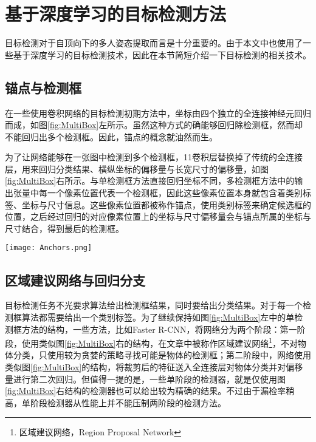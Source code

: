 \section{基于深度学习的目标检测方法}
\label{sec:factsobjectdetection}
目标检测对于自顶向下的多人姿态提取而言是十分重要的。由于本文中也使用了一些基于深度学习的目标检测技术，因此在本节简短介绍一下目标检测的相关技术。

\subsection{锚点与检测框}
\label{subsec:factsanchors}
在一些使用卷积网络的目标检测初期方法中，坐标由四个独立的全连接神经元回归而成，如图\ref{fig:MultiBox}左所示。虽然这种方式的确能够回归除检测框，然而却不能回归出多个检测框。因此，锚点的概念就油然而生。

为了让网络能够在一张图中检测到多个检测框，1\times1卷积层替换掉了传统的全连接层，用来回归分类结果、横纵坐标的偏移量与长宽尺寸的偏移量，如图\ref{fig:MultiBox}右所示。与单检测框方法直接回归坐标不同，多检测框方法中的输出张量中每一个像素位置代表一个检测框，因此这些像素位置本身就包含着类别标签、坐标与尺寸信息。这些像素位置都被称作锚点，使用类别标签来确定候选框的位置，之后经过回归的对应像素位置上的坐标与尺寸偏移量会与锚点所属的坐标与尺寸结合，得到最后的检测框。

\begin{figure*}[htbp]	
	\centering
	\texttt{[image: Anchors.png]}
	\caption{基于卷积神经网络的但检测框与多检测框方法}
	\label{fig:MultiBox}
\end{figure*}

\subsection{区域建议网络与回归分支}
\label{subsec:factsRPNregression}
目标检测任务不光要求算法给出检测框结果，同时要给出分类结果。对于每一个检测框算法都需要给出一个类别标签。为了继续保持如图\ref{fig:MultiBox}左中的单检测框方法的结构，一些方法，比如Faster R-CNN\cite{Ren2015Faster}，将网络分为两个阶段：第一阶段，使用类似图\ref{fig:MultiBox}右的结构，在文章中被称作区域建议网络\footnote{区域建议网络，Region Proposal Network}，不对物体分类，只使用较为贪婪的策略寻找可能是物体的检测框；第二阶段中，网络使用类似图\ref{fig:MultiBox}的结构，将裁剪后的特征送入全连接层对物体分类并对偏移量进行第二次回归。但值得一提的是，一些单阶段的检测器，就是仅使用图\ref{fig:MultiBox}右结构的检测器也可以给出较为精确的结果。不过由于漏检率稍高，单阶段检测器从性能上并不能压制两阶段的检测方法。

